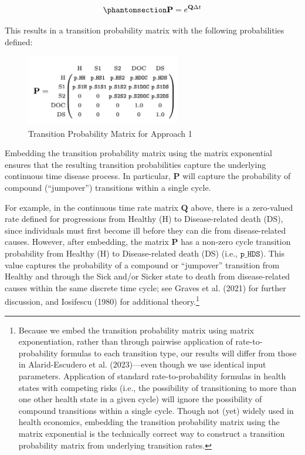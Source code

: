 \documentclass[
]{agujournal2019}
\begin{document}
\begin{equation}\phantomsection\label{eq-embed}{
\mathbf{P} = e^{\mathbf{Q}\Delta t}
}\end{equation}

This results in a transition probability matrix with the following
probabilities defined:

\begin{figure}[H]

{\centering \includegraphics[width=0.6\textwidth,height=\textheight]{images/P_model2.png}

}

\caption{Transition Probability Matrix for Approach 1}

\end{figure}%

Embedding the transition probability matrix using the matrix exponential
ensures that the resulting transition probabilities capture the
underlying continuous time disease process. In particular,
\(\mathbf{P}\) will capture the probability of compound (``jumpover'')
transitions within a single cycle.

For example, in the continuous time rate matrix \(\mathbf{Q}\) above,
there is a zero-valued rate defined for progressions from Healthy (H) to
Disease-related death (DS), since individuals must first become ill
before they can die from disease-related causes. However, after
embedding, the matrix \(\mathbf{P}\) has a non-zero cycle transition
probability from Healthy (H) to Disease-related death (DS) (i.e.,
\(\texttt{p\_HDS}\)). This value captures the probability of a compound
or ``jumpover'' transition from Healthy and through the Sick and/or
Sicker state to death from disease-related causes within the same
discrete time cycle; see Graves et al. (2021) for further discussion,
and Iosifescu (1980) for additional theory.\footnote{Because we embed
  the transition probability matrix using matrix exponentiation, rather
  than through pairwise application of rate-to-probability formulas to
  each transition type, our results will differ from those in
  Alarid-Escudero et al. (2023)---even though we use identical input
  parameters. Application of standard rate-to-probability formulas in
  health states with competing risks (i.e., the possibility of
  transitioning to more than one other health state in a given cycle)
  will ignore the possibility of compound transitions within a single
  cycle. Though not (yet) widely used in health economics, embedding the
  transition probability matrix using the matrix exponential is the
  technically correct way to construct a transition probability matrix
  from underlying transition rates.}
\end{document}
